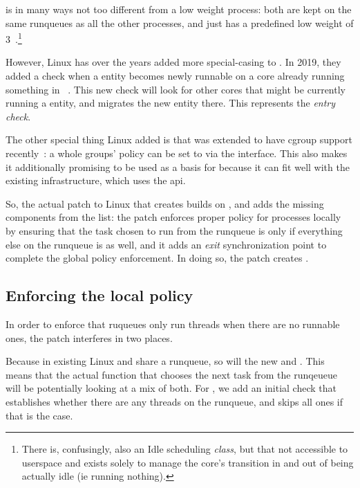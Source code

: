 \schedidle{} is in many ways not too different from a low weight \schednormal{}
process: both are kept on the same runqueues as all the other \schednormal{}
processes, and \schedidle{} just has a predefined low weight of
3~\cite{weight-idleprio}.\footnote{There is, confusingly, also an Idle scheduling
\textit{class}, but that not accessible to userspace and exists solely to manage
the core's transition in and out of being actually idle (ie running nothing).}

However, Linux has over the years added more special-casing to \schedidle{}. In
2019, they added a check when a \schednormal{} entity becomes newly runnable on
a core already running something in \schednormal{}~\cite{fixing-idle-article}.
This new check will look for other cores that might be currently running a
\schedidle{} entity, and migrates the new entity there. This represents the
\textit{entry check}.

The other special thing Linux added is that \schedidle{} was extended to have
cgroup support recently~\cite{lkml-idle-cgroup}: a whole groups' policy can be
set to \schedidle{} via the \cgroups{} interface. This also makes it
additionally promising to be used as a basis for \schedbe{} because it can fit
well with the existing infrastructure, which uses the \cgroups{} api.

So, the actual patch to Linux that creates \schedbe{} builds on \schedidle{},
and adds the missing components from the list: the patch enforces proper policy
for \schedbe{} processes locally by ensuring that the task chosen to run from
the runqueue is only \schedidle{} if everything else on the runqueue is as well,
and it adds an \textit{exit} synchronization point to complete the global policy
enforcement. In doing so, the patch creates \schedbe{}.

\subsection{Enforcing the local policy}

In order to enforce that ruqueues only run \schedbe{} threads when there are no
runnable \schednormal{} ones, the patch interferes in two places. 

Because in existing Linux \schedidle{} and \schednormal{} share a runqueue, so
will the new \schedbe{} and \schednormal{}. This means that the actual function
that chooses the next task from the runqeueue will be potentially looking at a
mix of both. For \schedbe{}, we add an initial check that establishes whether
there are any \schednormal{} threads on the runqueue, and skips all \schedbe{}
ones if that is the case. 

